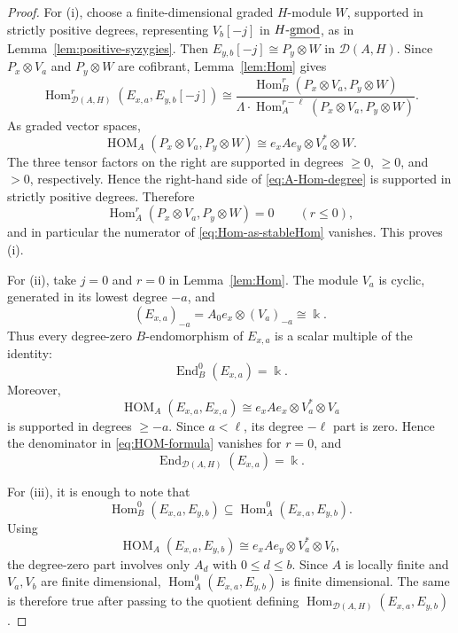 \documentclass[10pt,a4paper]{amsart}
\newcommand{\Der}{\mathcal{D}}
\newcommand{\End}{\operatorname{End}}
\newcommand{\HOM}{\operatorname{HOM}}
\newcommand{\Hom}{\operatorname{Hom}}
\newcommand{\kk}{\Bbbk}
\def\udgmod{\mbox{-\underline{gmod}}}
\theoremstyle{definition}
\begin{document}
\begin{proof}
For (i), choose a finite-dimensional graded $H$-module $W$, supported in
strictly positive degrees, representing $V_b[-j]$ in $H\udgmod$, as in
Lemma~\ref{lem:positive-syzygies}.  Then
$E_{y,b}[-j]\cong P_y\otimes W$ in $\Der(A,H)$.  Since
$P_x\otimes V_a$ and $P_y\otimes W$ are cofibrant, Lemma~\ref{lem:Hom} gives
\begin{equation}\label{eq:Hom-as-stableHom}
\Hom^{r}_{\Der(A,H)}(E_{x,a},E_{y,b}[-j])
\cong
\dfrac{\Hom^r_B(P_x\otimes V_a,P_y\otimes W)}
{\Lambda\cdot
\Hom_A^{r-\ell}(P_x\otimes V_a,P_y\otimes W)} .
\end{equation}
As graded vector spaces,
\begin{equation}\label{eq:A-Hom-degree}
\HOM_A(P_x\otimes V_a,P_y\otimes W)
\cong
e_xAe_y\otimes V_a^*\otimes W.
\end{equation}
The three tensor factors on the right are supported in degrees $\ge0$, $\ge0$, and
$>0$, respectively.  Hence the right-hand side of
\eqref{eq:A-Hom-degree} is supported in strictly positive degrees.  Therefore
\[
\Hom_A^r(P_x\otimes V_a,P_y\otimes W)=0
\qquad(r\le0),
\]
and in particular the numerator of \eqref{eq:Hom-as-stableHom} vanishes.
This proves (i).

For (ii), take $j=0$ and $r=0$ in Lemma~\ref{lem:Hom}.  The module $V_a$ is
cyclic, generated in its lowest degree $-a$, and
\[
(E_{x,a})_{-a}
=
A_0e_x\otimes (V_a)_{-a}
\cong\kk.
\]
Thus every degree-zero $B$-endomorphism of $E_{x,a}$ is a scalar multiple of
the identity:
\[
\End_B^0(E_{x,a})=\kk.
\]
Moreover,
\[
\HOM_A(E_{x,a},E_{x,a})
\cong e_xAe_x\otimes V_a^*\otimes V_a
\]
is supported in degrees $\ge-a$.  Since $a<\ell$, its degree $-\ell$ part is
zero.  Hence the denominator in \eqref{eq:HOM-formula} vanishes for $r=0$,
and
\[
\End_{\Der(A,H)}(E_{x,a})=\kk.
\]

For (iii), it is enough to note that
\[
\Hom_B^0(E_{x,a},E_{y,b})
\subseteq
\Hom_A^0(E_{x,a},E_{y,b}).
\]
Using
\[
\HOM_A(E_{x,a},E_{y,b})
\cong e_xAe_y\otimes V_a^*\otimes V_b,
\]
the degree-zero part involves only $A_d$ with $0\le d\le b$.  Since $A$ is
locally finite and $V_a,V_b$ are finite dimensional,
$\Hom_A^0(E_{x,a},E_{y,b})$ is finite dimensional.  The same is therefore
true after passing to the quotient defining
$\Hom_{\Der(A,H)}(E_{x,a},E_{y,b})$.
\end{proof}
\end{document}

